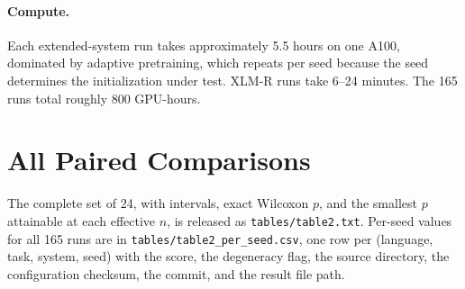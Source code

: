 \documentclass[11pt]{article}
\begin{document}
\paragraph{Compute.} Each extended-system run takes approximately 5.5 hours
on one A100, dominated by adaptive pretraining, which repeats per seed
because the seed determines the initialization under test. XLM-R runs take
6--24 minutes. The 165 runs total roughly 800 GPU-hours.

\section{All Paired Comparisons}
\label{app:paired}

The complete set of 24, with intervals, exact Wilcoxon $p$, and the smallest
$p$ attainable at each effective $n$, is released as
\texttt{tables/table2.txt}. Per-seed values for all 165 runs are in
\texttt{tables/table2\_per\_seed.csv}, one row per
(language, task, system, seed) with the score, the degeneracy flag, the
source directory, the configuration checksum, the commit, and the result file
path.
\end{document}

